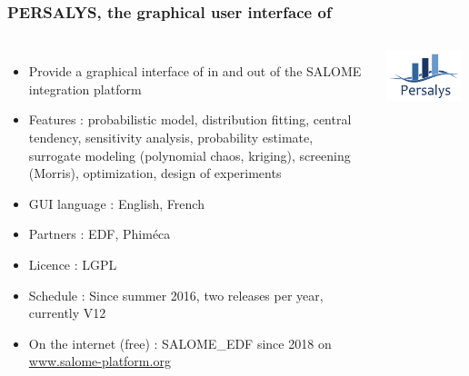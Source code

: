 \documentclass{beamer}
\begin{document}
\begin{frame}
\frametitle{PERSALYS, the graphical user interface of \ot{}}
	
\begin{columns}
	
\begin{itemize}
\item Provide a graphical interface of 
\ot{} in and out of the SALOME integration platform
\item Features : probabilistic model, 
	distribution fitting, central tendency, 
  sensitivity analysis, probability estimate, 
	surrogate modeling (polynomial chaos, kriging), screening (Morris), 
	optimization, design of experiments
\item GUI language : English, French

\item Partners : EDF, Phim\'eca
\item Licence : LGPL

\item Schedule : Since summer 2016, two releases per year, currently V12
\item On the internet (free) : SALOME\_EDF since 2018 on 
\url{www.salome-platform.org}

\end{itemize}


\begin{center}
\includegraphics[width=0.95\textwidth]{figures/PERSALYS-LOGO.png}
\end{center}

\end{columns}


\end{frame}
\end{document}
